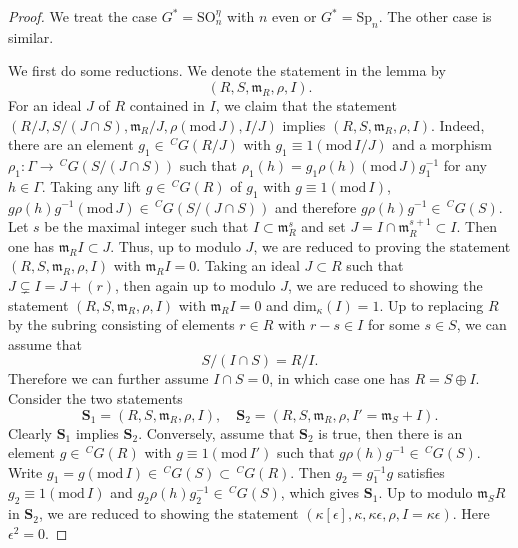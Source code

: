 \documentclass[12pt,oneside,reqno]{amsart}
\theoremstyle{plain}
\begin{document}
	\begin{proof}
		We treat the case $G^\ast=\mathrm{SO}_n^\eta$ with $n$ even or $G^\ast=\mathrm{Sp}_n$. The other case is similar.
		
		
		
		
		We first do some reductions.
		We denote the statement in the lemma by
		\[
		(R,S,\mathfrak{m}_R,\rho,I).
		\]
		For an ideal
		$J$ of $R$ contained in $I$,
		we claim that
		the statement
		$(R/J,S/(J\cap S),\mathfrak{m}_R/J,\rho(\mathrm{mod}\,J),I/J)$
		implies
		$(R,S,\mathfrak{m}_R,\rho,I)$. 
		Indeed,
		there are an element
		$g_1\in
		\,^CG(R/J)$
		with
		$g_1\equiv1(\mathrm{mod}\,I/J)$
		and a morphism
		$\rho_1
		\colon
		\Gamma
		\rightarrow
		\,^CG(S/(J\cap S))$
		such that
		$\rho_1(h)=g_1\rho(h)(\mathrm{mod}\,J)g_1^{-1}$
		for any
		$h\in\Gamma$.
		Taking any lift
		$g\in\,^CG(R)$ of
		$g_1$
		with
		$g\equiv1(\mathrm{mod}\,I)$,		
		$g\rho(h)g^{-1}
		(\mathrm{mod}\,J)
		\in
		\,^CG(S/(J\cap S))$
		and therefore
		$g\rho(h)g^{-1}
		\in
		\,^CG(S)$.
		Let
		$s$ be the maximal integer such that
		$I\subset\mathfrak{m}_R^s$
		and set
		$J=I\cap\mathfrak{m}_R^{s+1}\subset I$.
		Then one has
		$\mathfrak{m}_RI\subset J$.
		Thus,
		up to modulo
		$J$,
		we are reduced to proving the statement
		$(R,S,\mathfrak{m}_R,\rho,I)$
		with
		$\mathfrak{m}_RI=0$.
		Taking
		an ideal
		$J\subset R$
		such that
		$J\subsetneq I=J+(r)$,
		then again
		up to modulo $J$,
		we are reduced to showing the statement
		$(R,S,\mathfrak{m}_R,\rho,I)$
		with
		$\mathfrak{m}_RI=0$
		and
		$\mathrm{dim}_\kappa(I)=1$.
		Up to replacing
		$R$ by
		the subring
		consisting of elements
		$r\in R$
		with
		$r-s\in I$
		for some $s\in S$,
		we can assume that
		\[
		S/(I\cap S)=R/I.
		\]
		Therefore we can further assume
		$I\cap S=0$,
		in which case one has
		$R=S\oplus I$.
		Consider the two statements
		\[
		\mathbf{S}_1
		=
		(R,S,\mathfrak{m}_R,\rho,I),
		\quad
		\mathbf{S}_2
		=
		(R,S,\mathfrak{m}_R,\rho,I'=\mathfrak{m}_S+I).
		\]
		Clearly
		$\mathbf{S}_1$ implies
		$\mathbf{S}_2$.
		Conversely,
		assume that
		$\mathbf{S}_2$ is true,
		then
		there is an element
		$g\in\,^CG(R)$
		with
		$g\equiv1(\mathrm{mod}\,I')$
		such that
		$g\rho(h)g^{-1}
		\in
		\,^CG(S)$.
		Write
		$g_1=g(\mathrm{mod}\,I)
		\in
		\,^CG(S)\subset
		\,^CG(R)$.
		Then
		$g_2=g_1^{-1}g$
		satisfies
		$g_2\equiv1(\mathrm{mod}\,I)$
		and
		$g_2\rho(h)g_2^{-1}
		\in
		\,^CG(S)$,
		which gives
		$\mathbf{S}_1$.
		Up to modulo
		$\mathfrak{m}_SR$ in
		$\mathbf{S}_2$,
		we are reduced to showing
		the statement
		$(\kappa[\epsilon],\kappa,\kappa\epsilon,\rho,I=\kappa\epsilon)$.
		Here
		$\epsilon^2=0$.
		

\end{proof}
\end{document}
